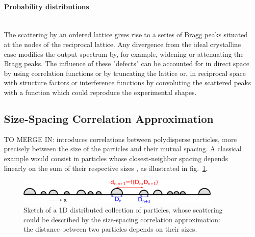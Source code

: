 \paragraph{Probability distributions} \mbox{}\\
The scattering by an ordered lattice gives rise to a series of Bragg peaks situated at the nodes of the reciprocal lattice. Any divergence from the ideal crystalline case modifies the output spectrum by, for example, widening or attenuating the Bragg peaks. The influence of these "defects" can be accounted for 
 in direct space by using correlation functions or by truncating the lattice or, in reciprocal space with structure factors or interference functions by convoluting the scattered peaks with a function which could reproduce the experimental shapes.

\subsection{Size-Spacing Correlation Approximation}

TO MERGE IN:
introduces correlations between polydisperse particles, more precisely between the size of the particles and their mutual spacing. A classical example would consist in particles whose closest-neighbor spacing depends linearly on the sum of their respective sizes \cite{LaLR07}, as illustrated in fig.~\ref{fig:ssca}.


\begin{figure}[tb]
\begin{center}
\includegraphics[width=0.9\textwidth]{fig/drawing/drawingSSCA.pdf}
\end{center}
\caption{Sketch of a 1D distributed collection of particles, whose scattering could be described by the size-spacing correlation approximation: the distance between two particles depends on their sizes.}
\label{fig:ssca}
\end{figure}


